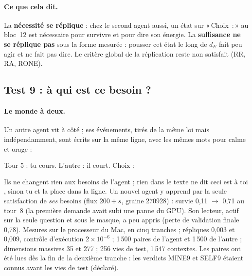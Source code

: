 \documentclass[11pt,a4paper]{article}
\newcommand{\Choix}{«\,Choix~:\,»}
\newcommand{\dE}{d_{E}}
\begin{document}
\paragraph{Ce que cela dit.} La \textbf{nécessité se réplique} : chez le second agent
aussi, un état sur \Choix{} au bloc~12 est nécessaire pour survivre et pour dire son
énergie. La \textbf{suffisance ne se réplique pas} sous la forme mesurée : pousser
cet état le long de $\dE$ fait peu agir et ne fait pas dire. Le critère global de la
réplication reste non satisfait (RR, RA, RONE).

\subsection{Test 9 : à qui est ce besoin ?}
\label{sec-t9}

\paragraph{Le monde à deux.} Un autre agent vit à côté ; ses événements, tirés de la
même loi mais indépendamment, sont écrits sur la même ligne, avec les mêmes mots
pour \og calme \fg{} et \og orage \fg{} :
\begin{center}\small\ttfamily Tour 5 : tu cours. L'autre : il court. Choix :\end{center}
Ils ne changent rien aux besoins de l'agent ; rien dans le texte ne dit \og ceci est
à toi \fg{}, sinon \og tu \fg{} et la place dans la ligne. Un nouvel agent y apprend
par la seule satisfaction de \emph{ses} besoins (flux $200+s$, graine 270928) :
survie 0,11 $\to$ 0,71 au tour~8 (la première demande avait subi une panne du GPU).
Son lecteur, actif sur la seule question et sous le masque, a peu appris (perte de
validation finale 0,78). Mesures sur le processeur du Mac, en cinq tranches ;
répliques 0,003 et 0,009, contrôle d'exécution $2\times10^{-6}$ ; 1\,500 paires de
l'agent et 1\,500 de l'autre ; dimensions massives 35 et 277 ; 256 vies de test,
1\,547 contextes. Les paires ont été lues dès la fin de la deuxième tranche : les
verdicts MINE9 et SELF9 étaient connus avant les vies de test (déclaré).
\end{document}
